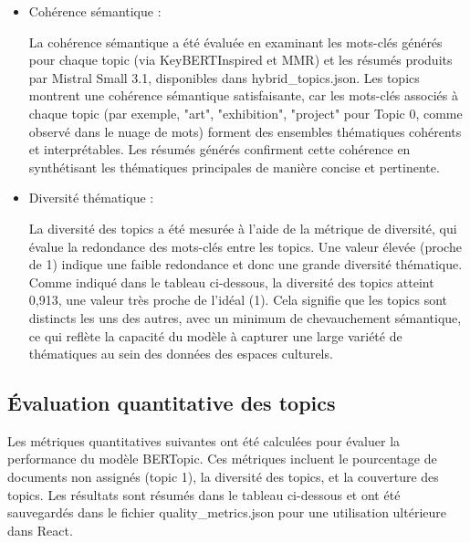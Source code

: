 \documentclass[mstat,12pt]{unswthesis}
\begin{document}
\begin{itemize}
    \item Cohérence sémantique :
    
    La cohérence sémantique a été évaluée en examinant les mots-clés générés pour chaque topic (via KeyBERTInspired et MMR) et les résumés produits par Mistral Small 3.1, disponibles dans hybrid\_topics.json. Les topics montrent une cohérence sémantique satisfaisante, car les mots-clés associés à chaque topic (par exemple, "art", "exhibition", "project" pour Topic 0, comme observé dans le nuage de mots) forment des ensembles thématiques cohérents et  interprétables. Les résumés générés confirment cette cohérence en synthétisant les thématiques principales de manière concise et pertinente.

    \bigskip
    
    \item Diversité thématique :

     La diversité des topics a été mesurée à l’aide de la métrique de diversité, qui évalue la redondance des mots-clés entre les topics. Une valeur élevée (proche de 1) indique une faible redondance et donc une grande diversité thématique. Comme indiqué dans le tableau ci-dessous, la diversité des topics atteint 0,913, une valeur très proche de l’idéal (1). Cela signifie que les topics sont distincts les uns des autres, avec un minimum de chevauchement sémantique, ce qui reflète la capacité du modèle à capturer une large variété de thématiques au sein des données des espaces culturels.
\end{itemize}

\subsection{ Évaluation quantitative des topics}

Les métriques quantitatives suivantes ont été calculées pour évaluer la performance du modèle BERTopic. Ces métriques incluent le pourcentage de documents non assignés (topic 1), la diversité des topics, et la couverture des topics. Les résultats sont résumés dans le tableau ci-dessous et ont été sauvegardés dans le fichier quality\_metrics.json pour une utilisation ultérieure dans React. 
\end{document}
